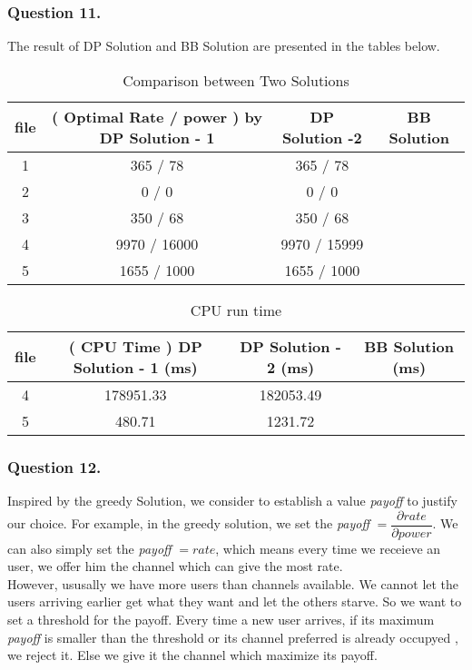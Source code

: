 \documentclass[11pt, oneside]{report}
\begin{document}
\subsubsection{Question 11. }

The result of DP Solution and BB Solution are presented in the tables below.

\begin{table}[!htbp]
\centering
\begin{tabular}{|c|c|c|c|}%
\hline
file & ( Optimal Rate / power ) by DP Solution - 1 & DP Solution -2 &   BB Solution \\
\hline
1 & 365 / 78  & 365 / 78 & \\
\hline
2 & 0 / 0 & 0 / 0 & \\
\hline
3 & 350 / 68 & 350 / 68 & \\
\hline
4 & 9970 / 16000 & 9970 / 15999 & \\
\hline
5 & 1655 / 1000 & 1655 / 1000 & \\
\hline
\end{tabular}
\caption{Comparison between Two Solutions}
\end{table}

\begin{table}[!htbp]
\centering
\begin{tabular}{|c|c|c|c|}%
\hline
file & ( CPU Time ) DP Solution - 1 (ms) & DP Solution - 2 (ms) & BB Solution (ms) \\
\hline
4 &  178951.33 & 182053.49 &\\
\hline
5 & 480.71 & 1231.72 &\\
\hline
\end{tabular}
\caption{CPU run time}
\end{table}

\subsubsection{Question 12. }
Inspired by the greedy Solution, we consider to establish a value \textit{payoff} to justify our choice. For example, in the greedy solution, we set the \textit{payoff} $ = \dfrac{\partial rate}{\partial power}$. We can also simply set the \textit{payoff} $ = rate$, which means every time we receieve an user, we offer him the channel which can give the most rate. \\

However, ususally we have more users than channels available. We cannot let the users arriving earlier get what they want and let the others starve. So we want to set a threshold for the payoff. Every time a new user arrives, if its maximum \textit{payoff} is smaller than the threshold or its channel preferred is already occupyed , we reject it. Else we give it the channel which maximize its payoff. \\
\end{document}
